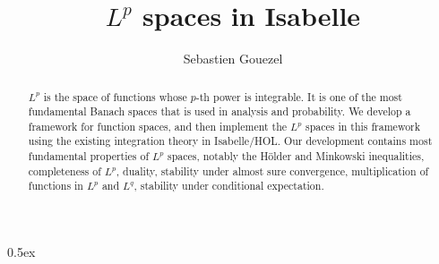 \documentclass[11pt,a4paper]{article}
\begin{document}
\title{$L^p$ spaces in Isabelle}
\author{Sebastien Gouezel}
\date{}
\maketitle

\begin{abstract}
$L^p$ is the space of functions whose $p$-th power is integrable. It is one
of the most fundamental Banach spaces that is used in analysis and
probability. We develop a framework for function spaces, and then implement
the $L^p$ spaces in this framework using the existing integration theory in
Isabelle/HOL. Our development contains most fundamental properties of $L^p$
spaces, notably the H\"older and Minkowski inequalities, completeness of
$L^p$, duality, stability under almost sure convergence, multiplication of
functions in $L^p$ and $L^q$, stability under conditional expectation.
\end{abstract}

\tableofcontents

\parindent 0pt\parskip 0.5ex



%
%
\end{document}
